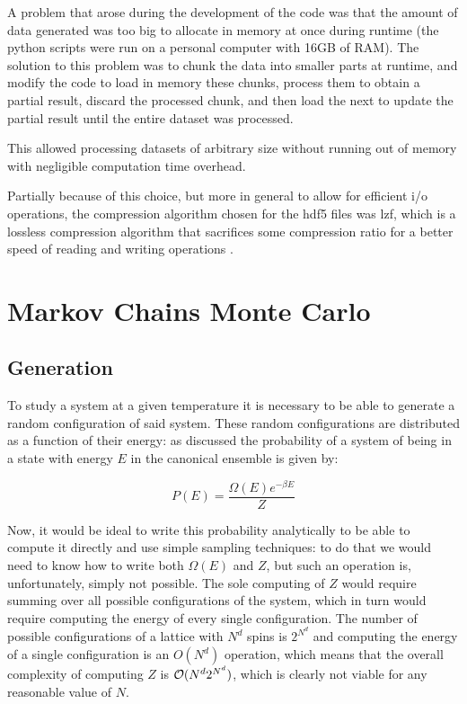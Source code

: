 \br

A problem that arose during the development of the code was that the amount of data generated was too big to allocate in memory at once during runtime (the python scripts were run on a personal computer with 16GB of RAM). The solution to this problem was to chunk the data into smaller parts at runtime, and modify the code to load in memory these chunks, process them to obtain a partial result, discard the processed chunk, and then load the next to update the partial result until the entire dataset was processed. 

This allowed processing datasets of arbitrary size without running out of memory with negligible computation time overhead.

Partially because of this choice, but more in general to allow for efficient i/o operations, the compression algorithm chosen for the hdf5 files was lzf, which is a lossless compression algorithm that sacrifices some compression ratio for a better speed of reading and writing operations .

\section{Markov Chains Monte Carlo}

\subsection{Generation}
\label{subsection:generation}

To study a system at a given temperature it is necessary to be able to generate a random configuration of said system. These random configurations are distributed as a function of their energy: as discussed the probability of a system of being in a state with energy $E$ in the canonical ensemble is given by:

\begin{equation}
	P(E) = \frac{\Omega(E) e^{-\beta E}}{Z}
\end{equation}

Now, it would be ideal to write this probability analytically to be able to compute it directly and use simple sampling techniques: to do that we would need to know how to write both $\Omega(E)$ and $Z$, but such an operation is, unfortunately, simply not possible. The sole computing of $Z$ would require summing over all possible configurations of the system, which in turn would require computing the energy of every single configuration. The number of possible configurations of a lattice with $N^d$ spins is $2^{N^d}$ and computing the energy of a single configuration is an $O(N^d)$ operation, which means that the overall complexity of computing $Z$ is $\mathcal{O}(N^d 2^{N^d})$, which is clearly not viable for any reasonable value of $N$.

